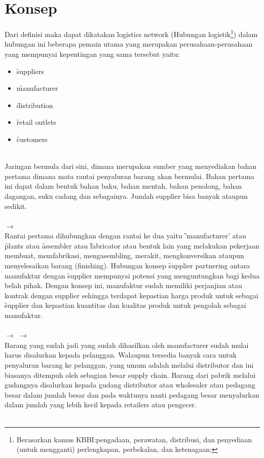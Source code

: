 \section{Konsep \SCM}
Dari definisi \SCM maka dapat dikatakan \f{logistics network} (Hubungan logistik\footnote{Berasarkan kamus KBBI:pengadaan, perawatan, distribusi, dan penyediaan (untuk mengganti) perlengkapan, perbekalan, dan ketenagaan;}) dalam hubungan ini beberapa pemain utama yang merupakan perusahaan-perusahaan yang mempunyai kepentingan yang sama tersebut yaitu\cite{Manajemen}:
\begin{itemize}
	\item \f{suppliers}
	\item \f{manufacturer}
	\item \f{distribution}
	\item \f{retail outlets}
	\item \f{customers}
\end{itemize}
 \\
Jaringan bermula dari sini, dimana merupakan sumber yang menyediakan bahan pertama dimana mata rantai penyaluran barang akan bermulai. Bahan pertama ini dapat dalam bentuk bahan baku, bahan mentah, bahan penolong, bahan dagangan, suku cadang dan sebagainya. Jumlah supplier bisa banyak ataupun sedikit.\\ \\
 $\to$  \\
Rantai pertama dihubungkan dengan rantai ke dua yaitu \f{'manufacturer'} atau \f{plants} atau \f{assembler} atau \f{fabricator} atau bentuk lain yang melakukan pekerjaan membuat, memfabrikasi, mengasembling, merakit, mengkonversikan ataupun menyelesaikan barang (finishing). Hubungan konsep
\f{supplier partnering} antara manufaktur dengan \f{supplier} mempunyai potensi yang menguntungkan bagi kedua belah pihak. Dengan konsep ini, manufaktur sudah memiliki perjanjian atau kontrak dengan supplier sehingga terdapat kepastian harga produk untuk sebagai \f{supplier} dan kepastian kuantitas dan kualitas produk untuk pengolah sebagai manufaktur.\\ \\
 $\to$  $\to$ \\
Barang yang sudah jadi yang sudah dihasilkan oleh manufacturer sudah mulai harus disalurkan kepada pelanggan. Walaupun tersedia banyak cara untuk penyaluran barang ke pelanggan, yang umum adalah melalui distributor dan ini biasanya ditempuh oleh sebagian besar supply chain. Barang dari pabrik melalui gudangnya disalurkan kepada gudang distributor atau wholesaler atau pedagang besar dalam jumlah besar dan pada waktunya nanti pedagang besar menyalurkan dalam jumlah yang lebih kecil kepada retailers atau pengecer.\\ \\
